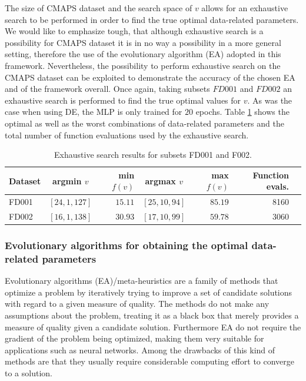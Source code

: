 \documentclass[12pt]{IEEEtran}%
\begin{document}
The size of CMAPS dataset and the search space of $v$ allows for an exhaustive search to be performed in order to find the true optimal data-related parameters. We would like to emphasize tough, that although exhaustive search is a possibility for CMAPS dataset it is in no way a possibility in a more general setting, therefore the use of the evolutionary algorithm (EA) adopted in this framework. Nevertheless, the possibility to perform exhaustive search on the CMAPS dataset can be exploited to demonstrate the accuracy of the chosen EA and of the framework overall. Once again, taking subsets $FD001$ and $FD002$ an exhaustive search is performed to find the true optimal values for $v$. As was the case when using DE, the MLP is only trained for $20$ epochs. Table \ref{table:true_optimal_data_params} shows the optimal as well as the worst combinations of data-related parameters and the total number of function evaluations used by the exhaustive search.

\begin{table}[!htb]
\centering
\begin{tabular}{l | c r c r r l}
	\hline
	 Dataset & argmin $v$ & min $f(v)$ & argmax $v$ & max $f(v)$ & Function evals.\\
  	\hline
  	FD001 & $\left[ 24, 1, 127 \right]$ & $15.11$ & $\left[ 25, 10, 94 \right]$ & $85.19$ & 8160\\
  	FD002 & $\left[ 16, 1, 138 \right]$ & $30.93$ & $\left[ 17, 10, 99 \right]$ & $59.78$ & 3060\\
  	\hline
\end{tabular}
\caption{Exhaustive search results for subsets FD001 and F002.}
\label{table:true_optimal_data_params}
\end{table}

\subsubsection{Evolutionary algorithms for obtaining the optimal data-related parameters}
\label{sec:ea_optimization_process}

Evolutionary algorithms (EA)/meta-heuristics are a family of methods that optimize a problem by iteratively trying to improve a set of candidate solutions with regard to a given measure of quality. The methods do not make any assumptions about the problem, treating it as a black box that merely provides a measure of quality given a candidate solution. Furthermore EA do not require the gradient of the problem being optimized, making them very suitable for applications such as neural networks. Among the drawbacks of this kind of methods are that they usually require considerable computing effort to converge to a solution.
\end{document}
